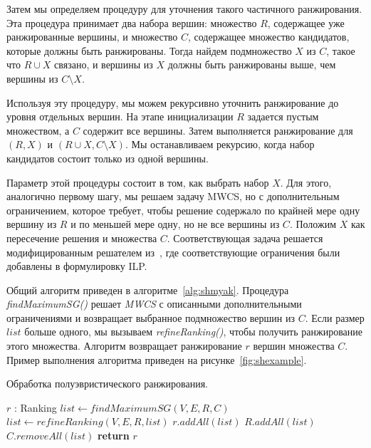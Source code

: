 Затем мы определяем процедуру для уточнения такого частичного ранжирования.
Эта процедура принимает два набора вершин: множество $R$, содержащее уже
ранжированные вершины, и множество $C$, содержащее множество кандидатов,
которые должны быть ранжированы. Тогда найдем подмножество $X$ из $C$, такое
что $R \cup X$ связано, и вершины из $X$ должны быть ранжированы выше, чем
вершины из $C \setminus X$.

Используя эту процедуру, мы можем рекурсивно уточнить ранжирование до уровня
отдельных вершин. На этапе инициализации $R$ задается пустым множеством, а $C$
содержит все вершины.  Затем выполняется ранжирование для $(R, X)$ и $(R \cup
X, C \setminus X)$.  Мы останавливаем рекурсию, когда набор кандидатов состоит
только из одной вершины.

Параметр этой процедуры состоит в том, как выбрать набор $X$.  Для этого,
аналогично первому шагу, мы решаем задачу MWCS, но с дополнительным
ограничением, которое требует, чтобы решение содержало по крайней мере одну
вершину из $R$ и по меньшей мере одну, но не все вершины из $C$. Положим $X$
как пересечение решения и множества $C$.  Соответствующая задача решается
модифицированным решателем из~\cite{Loboda2016}, где соответствующие
ограничения были добавлены в формулировку ILP.

Общий алгоритм приведен в алгоритме~\ref{alg:shmyak}.  Процедура
\emph{findMaximumSG()} решает \emph{MWCS} с описанными дополнительными
ограничениями и возвращает выбранное подмножество вершин из $C$.  Если размер
$list$ больше одного, мы вызываем \emph{refineRanking()}, чтобы получить
ранжирование этого множества. Алгоритм возвращает ранжирование $r$ вершин
множества $C$.  Пример выполнения алгоритма приведен на
рисунке~\ref{fig:shexample}.

\begin{algorithm}[h!]
    \caption{Обработка полуэвристического ранжирования.}\label{alg:shmyak}
    \begin{algorithmic}[1]
        \State $r$ : Ranking
            \State $list \gets  findMaximumSG(V, E, R, C)$
                \State $list \gets refineRanking(V, E, R, list)$
            \EndIf
            \State $r.addAll(list)$
            \State $R.addAll(list)$
            \State $C.removeAll(list)$
        \EndWhile
        \State \textbf{return} $r$
        \EndProcedure
    \end{algorithmic}
\end{algorithm}

